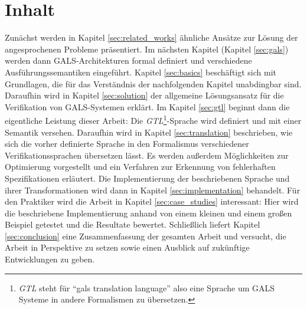 \section{Inhalt}
Zunächst werden in Kapitel \ref{sec:related_works} ähnliche Ansätze zur Lösung der angesprochenen Probleme präsentiert.
Im nächsten Kapitel (Kapitel \ref{sec:gals}) werden dann GALS-Architekturen formal definiert und verschiedene Ausführungssemantiken eingeführt.
Kapitel \ref{sec:basics} beschäftigt sich mit Grundlagen, die für das Verständnis der nachfolgenden Kapitel unabdingbar sind.
Daraufhin wird in Kapitel \ref{sec:solution} der allgemeine Lösungsansatz für die Verifikation von GALS-Systemen erklärt.
Im Kapitel \ref{sec:gtl} beginnt dann die eigentliche Leistung dieser Arbeit: Die \emph{GTL}\footnote{\emph{GTL} steht für "`gals translation language"' also eine Sprache um GALS Systeme in andere Formalismen zu übersetzen.}-Sprache wird definiert und mit einer Semantik versehen.
Daraufhin wird in Kapitel \ref{sec:translation} beschrieben, wie sich die vorher definierte Sprache in den Formalismus verschiedener Verifikationssprachen übersetzen lässt.
Es werden außerdem Möglichkeiten zur Optimierung vorgestellt und ein Verfahren zur Erkennung von fehlerhaften Spezifikationen erläutert.
Die Implementierung der beschriebenen Sprache und ihrer Transformationen wird dann in Kapitel \ref{sec:implementation} behandelt.
Für den Praktiker wird die Arbeit in Kapitel \ref{sec:case_studies} interessant:
Hier wird die beschriebene Implementierung anhand von einem kleinen und einem großen Beispiel getestet und die Resultate bewertet.
Schließlich liefert Kapitel \ref{sec:conclusion} eine Zusammenfassung der gesamten Arbeit und versucht, die Arbeit in Perspektive zu setzen sowie einen Ausblick auf zukünftige Entwicklungen zu geben.
